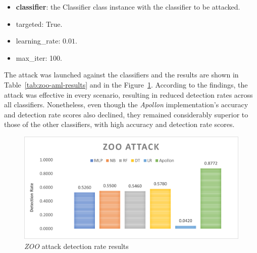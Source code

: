 \begin{itemize}
    \item \textbf{classifier}: the Classifier class instance with the classifier to be attacked.
    \item targeted: True.
    \item learning\_rate: $0.01$.
    \item max\_iter: 100.
\end{itemize}

The attack was launched against the classifiers and the results are shown in Table~\ref{tab:zoo-aml-results} and in the
Figure~\ref{fig:zoo-aml-results}.
According to the findings, the attack was effective in every scenario, resulting in reduced detection rates across all classifiers.
Nonetheless, even though the \textit{Apollon} implementation's accuracy and detection rate scores also declined, they remained considerably
superior to those of the other classifiers, with high accuracy and detection rate scores.

\begin{table}
    \centering
    \caption{Results of the \textit{ZOO} AML attack}
    \label{tab:zoo-aml-results}
\end{table}

\begin{figure}
    \centering
    \includegraphics[width=0.9\columnwidth]{ZOO.png}
    \caption{\textit{ZOO} attack detection rate results}
    \label{fig:zoo-aml-results}
\end{figure}


